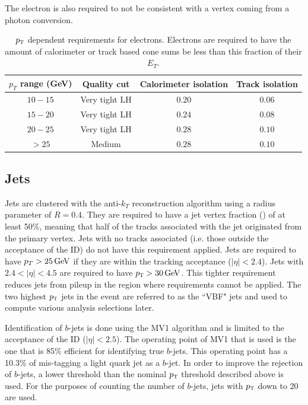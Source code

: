 The electron is also required to not be consistent with a vertex coming from a photon conversion. 


\begin{table}[h!]
\centering
\captionsetup{justification=centering}

\hspace{-10pt}
\begin{tabular}{|c|c|c|c|}
\hline
$p_T$ range (GeV) & Quality cut & Calorimeter isolation & Track isolation\\ \hline \hline
$10-15$ & Very tight LH & $0.20$ & $0.06$ \\ \hline
$15-20$ & Very tight LH & $0.24$ & $0.08$ \\ \hline
$20-25$ & Very tight LH & $0.28$ & $0.10$ \\ \hline
$> 25$ & Medium & $0.28$ & $0.10$ \\ \hline
\end{tabular}

\caption{
$p_{\textrm{\footnotesize\sc t}}$ dependent requirements for electrons. Electrons are required to have the amount of calorimeter or track based cone sums be less than this fraction of their $E_{T}$.
}
\label{tab:elecselec}
\end{table}

\subsection{Jets}

Jets are clustered with the anti-$k_T$ reconstruction algorithm using a radius parameter of $R=0.4$. They are required to have a jet vertex fraction (\jvf) of at least 50\%, meaning that half of the tracks associated with the jet originated from the primary vertex. Jets with no tracks associated (i.e. those outside the acceptance of the ID) do not have this requirement applied. Jets are required to have $p_{T} > 25 \GeV$ if they are within the tracking acceptance ($|\eta| < 2.4$). Jets with $2.4 < |\eta| < 4.5$ are required to have $\pT > 30 \GeV$. This tighter requirement reduces jets from pileup in the region where \jvf requirements cannot be applied. The two highest $p_{\textrm{\footnotesize\sc t}}$ jets in the event are referred to as the ``VBF" jets and used to compute various analysis selections later. 

Identification of $b$-jets is done using the MV1 algorithm and is limited to the acceptance of the ID ($|\eta| < 2.5$). The operating point of MV1 that is used is the one that is 85\% efficient for identifying true $b$-jets. This operating point has a 10.3\% of mis-tagging a light quark jet as a $b$-jet. In order to improve the rejection of $b$-jets, a lower threshold than the nominal $p_{\textrm{\footnotesize\sc t}}$ threshold described above is used. For the purposes of counting the number of $b$-jets, jets with $p_{\textrm{\footnotesize\sc t}}$ down to 20 \GeV are used. 

